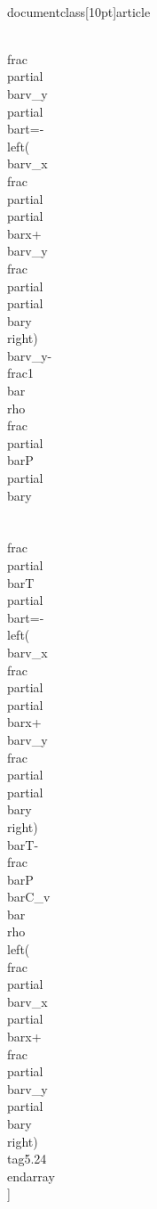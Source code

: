 \\documentclass[10pt]{article}
\begin{document}
\\frac{\\partial \\bar{v}_{y}}{\\partial \\bar{t}}=-\\left(\\bar{v}_{x} \\frac{\\partial}{\\partial \\bar{x}}+\\bar{v}_{y} \\frac{\\partial}{\\partial \\bar{y}}\\right) \\bar{v}_{y}-\\frac{1}{\\bar{\\rho}} \\frac{\\partial \\bar{P}}{\\partial \\bar{y}} \\\\
\\frac{\\partial \\bar{T}}{\\partial \\bar{t}}=-\\left(\\bar{v}_{x} \\frac{\\partial}{\\partial \\bar{x}}+\\bar{v}_{y} \\frac{\\partial}{\\partial \\bar{y}}\\right) \\bar{T}-\\frac{\\bar{P}}{\\bar{C}_{v} \\bar{\\rho}}\\left(\\frac{\\partial \\bar{v}_{x}}{\\partial \\bar{x}}+\\frac{\\partial \\bar{v}_{y}}{\\partial \\bar{y}}\\right) \\tag{5.24}
\\end{array}
\\]
\end{document}
